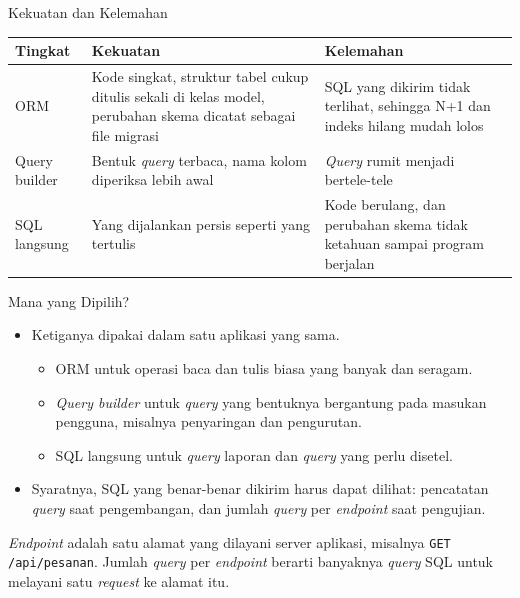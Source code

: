 \documentclass[aspectratio=169, table, 12pt]{beamer}
\begin{document}
\begin{frame}{{\Large Kekuatan dan Kelemahan}}
  \vspace{8pt}
  \centering
  {\small
  \begin{tabularx}{\textwidth}{lYY}
    \hline
    \textbf{Tingkat} & \textbf{Kekuatan} & \textbf{Kelemahan} \\
    \hline
    ORM & Kode singkat, struktur tabel cukup ditulis sekali di kelas model, perubahan skema dicatat sebagai file migrasi & SQL yang dikirim tidak terlihat, sehingga N+1 dan indeks hilang mudah lolos \\
    \hline
    Query builder & Bentuk \textit{query} terbaca, nama kolom diperiksa lebih awal & \textit{Query} rumit menjadi bertele-tele \\
    \hline
    SQL langsung & Yang dijalankan persis seperti yang tertulis & Kode berulang, dan perubahan skema tidak ketahuan sampai program berjalan \\
    \hline
  \end{tabularx}}
\end{frame}

\begin{frame}{{\Large Mana yang Dipilih?}}
  \vspace{8pt}
  \begin{itemize}
    \item Ketiganya dipakai dalam satu aplikasi yang sama.
    \begin{itemize}
      \item ORM untuk operasi baca dan tulis biasa yang banyak dan seragam.
      \item \textit{Query builder} untuk \textit{query} yang bentuknya bergantung pada
            masukan pengguna, misalnya penyaringan dan pengurutan.
      \item SQL langsung untuk \textit{query} laporan dan \textit{query} yang perlu disetel.
    \end{itemize}
    \item Syaratnya, SQL yang benar-benar dikirim harus dapat dilihat:
          pencatatan \textit{query} saat pengembangan, dan jumlah \textit{query} per
          \textit{endpoint} saat pengujian.
  \end{itemize}
  \vspace{4pt}
  {\footnotesize \textit{Endpoint} adalah satu alamat yang dilayani server
  aplikasi, misalnya \texttt{GET /api/pesanan}. Jumlah \textit{query} per
  \textit{endpoint} berarti banyaknya \textit{query} SQL untuk melayani satu
  \textit{request} ke alamat itu.}
\end{frame}
\end{document}
